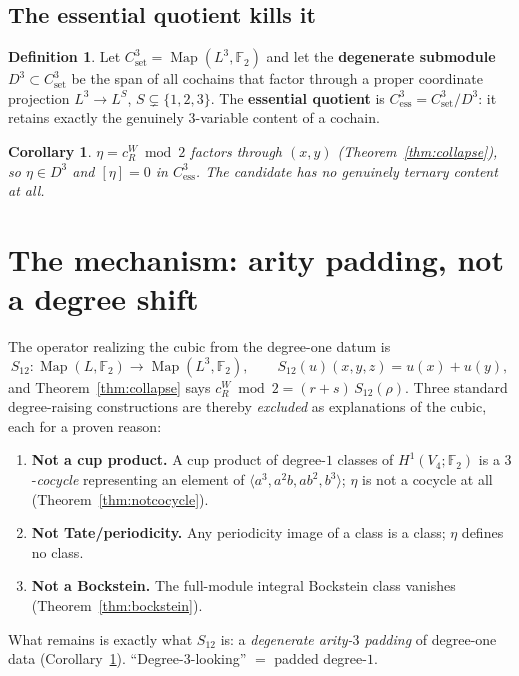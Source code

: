 \documentclass[11pt]{article}
\newtheorem{corollary}[theorem]{Corollary}
\theoremstyle{definition}
\newtheorem{definition}[theorem]{Definition}
\theoremstyle{remark}
\newcommand{\F}{\mathbb{F}}
\newcommand{\Map}{\operatorname{Map}}
\newcommand{\cR}{c_R^W}
\begin{document}
\subsection{The essential quotient kills it}

\begin{definition}
Let $C^3_{\mathrm{set}}=\Map(L^3,\F_2)$ and let the \textbf{degenerate submodule} $D^3\subset C^3_{\mathrm{set}}$ be the span of all cochains that factor through a proper coordinate projection $L^3\to L^S$, $S\subsetneq\{1,2,3\}$. The \textbf{essential quotient} is $C^3_{\mathrm{ess}}=C^3_{\mathrm{set}}/D^3$: it retains exactly the genuinely $3$-variable content of a cochain.
\end{definition}

\begin{corollary}\label{cor:essential}
$\eta=\cR\bmod2$ factors through $(x,y)$ (Theorem~\ref{thm:collapse}), so $\eta\in D^3$ and $[\eta]=0$ in $C^3_{\mathrm{ess}}$. The candidate has no genuinely ternary content at all.
\end{corollary}

\section{The mechanism: arity padding, not a degree shift}\label{sec:mechanism}

The operator realizing the cubic from the degree-one datum is
\[
S_{12}:\Map(L,\F_2)\to\Map(L^3,\F_2),\qquad S_{12}(u)(x,y,z)=u(x)+u(y),
\]
and Theorem~\ref{thm:collapse} says $\cR\bmod2=(r{+}s)\,S_{12}(\rho)$. Three standard degree-raising constructions are thereby \emph{excluded} as explanations of the cubic, each for a proven reason:
\begin{enumerate}
\item \textbf{Not a cup product.} A cup product of degree-$1$ classes of $H^1(V_4;\F_2)$ is a $3$-\emph{cocycle} representing an element of $\langle a^3,a^2b,ab^2,b^3\rangle$; $\eta$ is not a cocycle at all (Theorem~\ref{thm:notcocycle}).
\item \textbf{Not Tate/periodicity.} Any periodicity image of a class is a class; $\eta$ defines no class.
\item \textbf{Not a Bockstein.} The full-module integral Bockstein class vanishes (Theorem~\ref{thm:bockstein}).
\end{enumerate}
What remains is exactly what $S_{12}$ is: a \emph{degenerate arity-$3$ padding} of degree-one data (Corollary~\ref{cor:essential}). ``Degree-$3$-looking'' $=$ padded degree-$1$.
\end{document}
